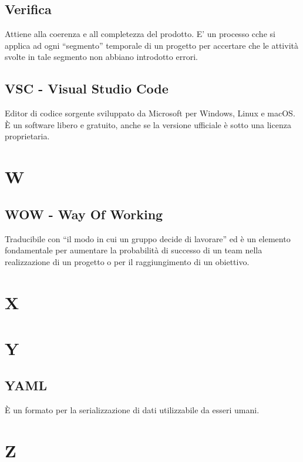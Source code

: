 \documentclass{classes/base}
\begin{document}
        \subsection*{Verifica}
        Attiene alla coerenza e all completezza del prodotto. E’ un processo cche si applica ad ogni “segmento” temporale di un progetto per accertare che le attività svolte in tale segmento non abbiano introdotto errori.

        \subsection*{VSC - Visual Studio Code}
        Editor di codice sorgente sviluppato da Microsoft per Windows, Linux e macOS. È un software libero e gratuito, anche se la versione ufficiale è sotto una licenza proprietaria.

        \newpage  
    \section{W}
        \subsection*{WOW - Way Of Working}
        Traducibile con “il modo in cui un gruppo decide di lavorare” ed è un elemento fondamentale per aumentare la probabilità di successo di un team nella realizzazione di un progetto o per il raggiungimento di un obiettivo.  
        \newpage  
    \section{X}
    \newpage  
    \section{Y}
        \subsection*{YAML}
        È un formato per la serializzazione di dati utilizzabile da esseri umani.
        
        \newpage  
    \section{Z}
\end{document}
